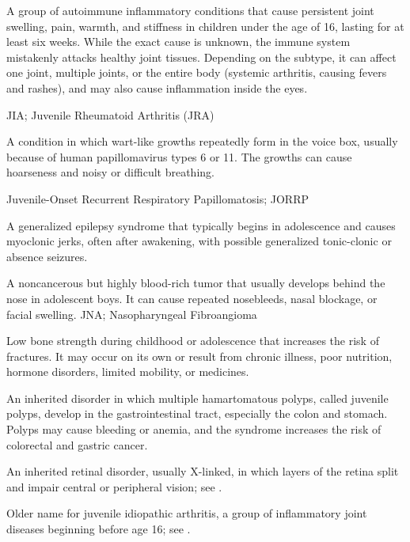  A group of autoimmune inflammatory conditions that cause persistent joint swelling, pain, warmth, and stiffness in children under the age of 16, lasting for at least six weeks. While the exact cause is unknown, the immune system mistakenly attacks healthy joint tissues. Depending on the subtype, it can affect one joint, multiple joints, or the entire body (systemic arthritis, causing fevers and rashes), and may also cause inflammation inside the eyes.

\synonyms
JIA; Juvenile Rheumatoid Arthritis (JRA)

 A condition in which wart-like growths repeatedly form in the voice box, usually because of human papillomavirus types 6 or 11. The growths can cause hoarseness and noisy or difficult breathing.

\synonyms
Juvenile-Onset Recurrent Respiratory Papillomatosis; JORRP

 A generalized epilepsy syndrome that typically begins in adolescence and causes myoclonic jerks, often after awakening, with possible generalized tonic-clonic or absence seizures.

 A noncancerous but highly blood-rich tumor that usually develops behind the nose in adolescent boys. It can cause repeated nosebleeds, nasal blockage, or facial swelling.
\synonyms
JNA; Nasopharyngeal Fibroangioma

 Low bone strength during childhood or adolescence that increases the risk of fractures. It may occur on its own or result from chronic illness, poor nutrition, hormone disorders, limited mobility, or medicines.

 An inherited disorder in which multiple hamartomatous polyps, called juvenile polyps, develop in the gastrointestinal tract, especially the colon and stomach. Polyps may cause bleeding or anemia, and the syndrome increases the risk of colorectal and gastric cancer.

 An inherited retinal disorder, usually X-linked, in which layers of the retina split and impair central or peripheral vision; see .

 Older name for juvenile idiopathic arthritis, a group of inflammatory joint diseases beginning before age 16; see .

